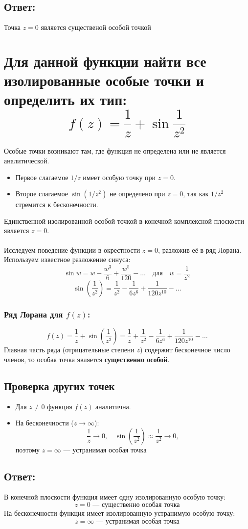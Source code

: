 \documentclass[12pt]{article}
\begin{document}
\subsection*{Ответ:}
Точка $z = 0$ является существеной особой точкой

\section{Для данной функции найти все изолированные особые точки и определить их тип: $$f(z) = \frac{1}{z} + \sin{\frac{1}{z^2}}$$}
Особые точки возникают там, где функция не определена или не является аналитической.
\begin{itemize}
    \item Первое слагаемое \({1}/{z}\) имеет особую точку при \(z = 0\).
    \item Второе слагаемое \(\sin\left({1}/{z^2}\right)\) не определено при \(z = 0\), так как \({1}/{z^2}\) стремится к бесконечности.
\end{itemize}
Единственной изолированной особой точкой в конечной комплексной плоскости является \(z = 0\).
\\
\\
Исследуем поведение функции в окрестности \(z = 0\), разложив её в ряд Лорана.
\\
Используем известное разложение синуса:
$$\sin w = w - \frac{w^3}{6} + \frac{w^5}{120} - \dots \quad \text{для} \quad w = \frac{1}{z^2}$$
$$\sin\left(\frac{1}{z^2}\right) = \frac{1}{z^2} - \frac{1}{6 z^6} + \frac{1}{120 z^{10}} - \dots$$
\subsubsection*{Ряд Лорана для \(f(z)\):}
$$f(z) = \frac{1}{z} + \sin\left(\frac{1}{z^2}\right) = \frac{1}{z} + \frac{1}{z^2} - \frac{1}{6 z^6} + \frac{1}{120 z^{10}} - \dots$$
Главная часть ряда (отрицательные степени \(z\)) содержит бесконечное число членов, то особая точка является \textbf{существенно особой}.
\subsection*{Проверка других точек}
\begin{itemize}
    \item Для \(z \neq 0\) функция \(f(z)\) аналитична.
    \item На бесконечности (\(z \to \infty\)):
    $$\frac{1}{z} \to 0, \quad \sin\left(\frac{1}{z^2}\right) \approx \frac{1}{z^2} \to 0,$$
    поэтому \(z = \infty\) — устранимая особая точка
\end{itemize}
\subsection*{Ответ:}
В конечной плоскости функция имеет одну изолированную особую точку:
$$z = 0 \text{ — существенно особая точка}$$
На бесконечности функция имеет изолированную устранимую особую точку:
$$z = \infty \text{ — устранимая особая точка}$$
\end{document}
